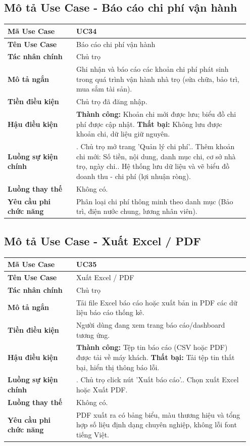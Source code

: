 \documentclass[a4paper,oneside]{report}
\begin{document}
\subsection{Mô tả Use Case - Báo cáo chi phí vận hành}

\begin{longtable}[]{@{}>{\RaggedRight\arraybackslash}p{0.27\linewidth}>{\RaggedRight\arraybackslash}p{0.68\linewidth}@{}}
\toprule
\textbf{Mã Use Case} & UC34\tabularnewline
\midrule
\endhead
\textbf{Tên Use Case} & Báo cáo chi phí vận hành\tabularnewline
\textbf{Tác nhân chính} & Chủ trọ\tabularnewline
\textbf{Mô tả ngắn} & Ghi nhận và báo cáo các khoản chi phí phát sinh
trong quá trình vận hành nhà trọ (sửa chữa, bảo trì, mua sắm tài
sản).\tabularnewline
\textbf{Tiền điều kiện} & Chủ trọ đã đăng nhập.\tabularnewline
\textbf{Hậu điều kiện} & \textbf{Thành công:} Khoản chi mới được lưu; biểu đồ chi phí được cập nhật.\newline 
\textbf{Thất bại:} Không lưu được khoản chi, dữ liệu giữ nguyên.\tabularnewline
\textbf{Luồng sự kiện chính} & 1. Chủ trọ mở trang
'Quản lý chi phí'.\newline 2. Thêm khoản chi mới: Số tiền, nội
dung, danh mục chi, cơ sở nhà trọ, ngày chi.\newline 3. Hệ thống
lưu dữ liệu và vẽ biểu đồ doanh thu - chi phí (lợi nhuận
ròng).\tabularnewline
\textbf{Luồng thay thế} & Không có.\tabularnewline
\textbf{Yêu cầu phi chức năng} & Phân loại chi phí thông minh theo danh
mục (Bảo trì, điện nước chung, lương nhân viên).\tabularnewline
\bottomrule
\end{longtable}

\subsection{Mô tả Use Case - Xuất Excel / PDF}

\begin{longtable}[]{@{}>{\RaggedRight\arraybackslash}p{0.27\linewidth}>{\RaggedRight\arraybackslash}p{0.68\linewidth}@{}}
\toprule
\textbf{Mã Use Case} & UC35\tabularnewline
\midrule
\endhead
\textbf{Tên Use Case} & Xuất Excel / PDF\tabularnewline
\textbf{Tác nhân chính} & Chủ trọ\tabularnewline
\textbf{Mô tả ngắn} & Tải file Excel báo cáo hoặc xuất bản in PDF các dữ
liệu báo cáo thống kê.\tabularnewline
\textbf{Tiền điều kiện} & Người dùng đang xem trang báo cáo/dashboard
tương ứng.\tabularnewline
\textbf{Hậu điều kiện} & \textbf{Thành công:} Tệp tin báo cáo (CSV hoặc PDF) được tải về máy khách.\newline 
\textbf{Thất bại:} Tải tệp tin thất bại, hiển thị thông báo lỗi.\tabularnewline
\textbf{Luồng sự kiện chính} & 1. Chủ trọ click nút
'Xuất báo cáo'.\newline 2. Chọn xuất Excel hoặc Xuất PDF.\tabularnewline
\textbf{Luồng thay thế} & Không có.\tabularnewline
\textbf{Yêu cầu phi chức năng} & PDF xuất ra có bảng biểu, màu thương
hiệu và tổng hợp số liệu định dạng chuyên nghiệp, không lỗi font tiếng
Việt.\tabularnewline
\bottomrule
\end{longtable}
\end{document}
